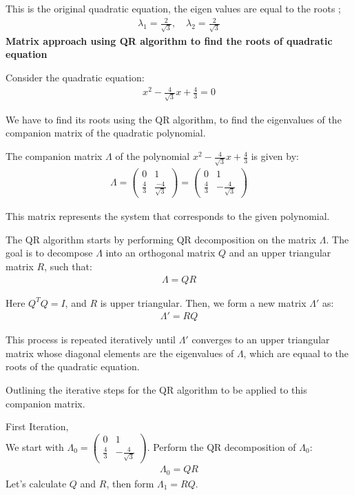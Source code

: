 \documentclass[journal]{IEEEtran}
\begin{document}
This is the original quadratic equation, the eigen values are equal to the roots ;
\begin{align}
    \lambda_1 = \frac{2}{\sqrt{3}}, \quad \lambda_2 = \frac{2}{\sqrt{3}}
\end{align}
\textbf{Matrix approach using QR algorithm to find the roots of quadratic equation}

Consider the quadratic equation:
\begin{align}
    x^2 - \frac{4}{\sqrt{3}}x + \frac{4}{3} = 0
\end{align}

We have to find its roots using the QR algorithm, to find the eigenvalues of the companion matrix of the quadratic polynomial.

The companion matrix \( \Lambda \) of the polynomial  $x^2 - \frac{4}{\sqrt{3}}x +\frac{4}{3} $ is given by:
\begin{align}
\Lambda = \begin{pmatrix} 
0 & 1 \\
\frac{4}{3} & \frac{-4}{\sqrt{3}}
\end{pmatrix}
= \begin{pmatrix}
0 & 1 \\
\frac{4}{3} & -\frac{4}{\sqrt{3}}
\end{pmatrix}
\end{align}

This matrix represents the system that corresponds to the given polynomial.

The QR algorithm starts by performing QR decomposition on the matrix \( \Lambda \). The goal is to decompose \( \Lambda \) into an orthogonal matrix \( Q \) and an upper triangular matrix \( R \), such that:
\begin{align}
    \Lambda = QR
\end{align}

Here \( Q^T Q = I \), and \( R \) is upper triangular. Then, we form a new matrix \( \Lambda' \) as:
\begin{align}
    \Lambda' = RQ
\end{align}

This process is repeated iteratively until \( \Lambda' \) converges to an upper triangular matrix whose diagonal elements are the eigenvalues of \( \Lambda \), which are equaal to the roots of the quadratic equation.

Outlining the iterative steps for the QR algorithm to be applied to this companion matrix.

First Iteration,\\
We start with \( \Lambda_0 = \begin{pmatrix} 0 & 1 \\ \frac{4}{3} & -\frac{4}{\sqrt{3}} \end{pmatrix} \).
Perform the QR decomposition of \( \Lambda_0 \):
\begin{align}
    \Lambda_0 = QR
\end{align}
Let's calculate \( Q \) and \( R \), then form \( \Lambda_1 = RQ \).
\end{document}
